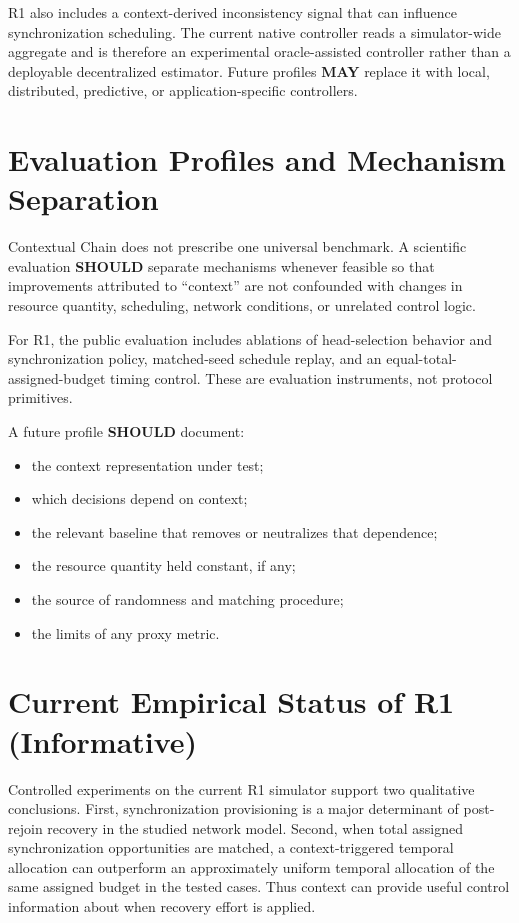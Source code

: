 \documentclass[11pt]{article}
\begin{document}
R1 also includes a context-derived inconsistency signal that can influence synchronization
scheduling. The current native controller reads a simulator-wide aggregate and is therefore an
experimental oracle-assisted controller rather than a deployable decentralized estimator. Future
profiles \textbf{MAY} replace it with local, distributed, predictive, or application-specific
controllers.

\section{Evaluation Profiles and Mechanism Separation}
Contextual Chain does not prescribe one universal benchmark. A scientific evaluation
\textbf{SHOULD} separate mechanisms whenever feasible so that improvements attributed to
``context'' are not confounded with changes in resource quantity, scheduling, network conditions,
or unrelated control logic.

For R1, the public evaluation includes ablations of head-selection behavior and synchronization
policy, matched-seed schedule replay, and an equal-total-assigned-budget timing control. These are
evaluation instruments, not protocol primitives.

A future profile \textbf{SHOULD} document:
\begin{itemize}
  \item the context representation under test;
  \item which decisions depend on context;
  \item the relevant baseline that removes or neutralizes that dependence;
  \item the resource quantity held constant, if any;
  \item the source of randomness and matching procedure;
  \item the limits of any proxy metric.
\end{itemize}

\section{Current Empirical Status of R1 (Informative)}
Controlled experiments on the current R1 simulator support two qualitative conclusions. First,
synchronization provisioning is a major determinant of post-rejoin recovery in the studied
network model. Second, when total assigned synchronization opportunities are matched, a
context-triggered temporal allocation can outperform an approximately uniform temporal
allocation of the same assigned budget in the tested cases. Thus context can provide useful
control information about when recovery effort is applied.
\end{document}
